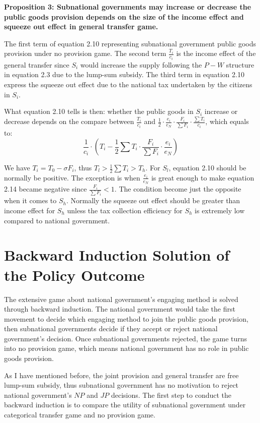 \begin{itemize}
\textbf{Proposition 3: Subnational governments may increase or decrease the public goods provision depends on the size of the income effect and squeeze out effect in general transfer game.}

The first term of equation 2.10 representing subnational government public goods provision under no provision game. The second term $\frac{T_i}{c_i}$ is the income effect of the general transfer since $S_i$ would increase the supply following the $P-W$ structure in equation 2.3 due to the lump-sum subsidy. The third term in equation 2.10 express the squeeze out effect due to the national tax undertaken by the citizens in $S_i$.

What equation 2.10 tells is then: whether the public goods in $S_i$ increase or decrease depends on the compare between $\frac{T_i}{c_i}$ and $\frac{1}{2} \cdot \frac{e_i}{e_N}\cdot \frac{F_i}{\sum F_i} \cdot \frac{\sum T_i}{c_i}$, which equals to:
\begin{equation}
    \frac{1}{c_i}\cdot (T_i-\frac{1}{2}\sum T_i\cdot \frac{F_i}{\sum F_i}\cdot \frac{e_i}{e_N})
\end{equation}

We have $T_i=T_0 - \sigma F_i$, thus $T_l>\frac{1}{2}\sum T_i >T_h$. For $S_l$, equation 2.10 should be normally be positive. The exception is when $\frac{e_i}{e_N}$ is great enough to make equation 2.14 became negative since $\frac{F_i}{\sum F_i}<1$. The condition become just the opposite when it comes to $S_h$. Normally the squeeze out effect should be greater than income effect for $S_h$ unless the tax collection efficiency for $S_h$ is extremely low compared to national government.

\section{Backward Induction Solution of the Policy Outcome}


The extensive game about national government's engaging method is solved through backward induction. The national government would take the first movement to decide which engaging method to join the public goods provision, then subnational governments decide if they accept or reject national government's decision. Once subnational governments rejected, the game turns into no provision game, which means national government has no role in public goods provision.

As I have mentioned before, the joint provision and general transfer are free lump-sum subsidy, thus subnational government has no motivation to reject national government's $NP$ and $JP$ decisions. The first step to conduct the backward induction is to compare the utility of subnational government under categorical transfer game and no provision game.


\end{itemize}
